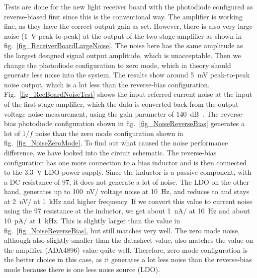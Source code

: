 Tests are done for the new light receiver board with the photodiode configured as reverse-biased first since this is the conventional way.  The amplifier is working fine, as they have the correct output gain as set.  However, there is also very large noise (\qty{1}{V} peak-to-peak) at the output of the two-stage amplifier as shown in fig.~\ref{fig_ReceiverBoardLargeNoise}.  The noise here has the same amplitude as the largest designed signal output amplitude, which is unacceptable.  Then we change the photodiode configuration to zero mode, which in theory should generate less noise into the system.  The results show around \qty{5}{mV} peak-to-peak noise output, which is a lot less than the reverse-bias configuration.  Fig.~\ref{fig_RecBoardNoiseTest} shows the input referred current noise at the input of the first stage amplifier, which the data is converted back from the output voltage noise measurement, using the gain parameter of \qty{140}{dB\Omega}.  The reverse-bias photodiode configuration shown in fig.~\ref{fig_NoiseReverseBias} generates a lot of $1/f$ noise than the zero mode configuration shown in fig.~\ref{fig_NoiseZeroMode}.  To find out what caused the noise performance difference, we have looked into the circuit schematic.  The reverse-bias configuration has one more connection to a bias inductor and is then connected to the \qty{3.3}{V} LDO power supply.  Since the inductor is a passive component, with a DC resistance of \qty{97}{\Omega}, it does not generate a lot of noise.  The LDO on the other hand, generates up to \qty{100}{nV/\sqrthz} voltage noise at \qty{10}{Hz}, and reduces to and stays at \qty{2}{nV/\sqrthz} at \qty{1}{kHz} and higher frequency.  If we convert this value to current noise using the \qty{97}{\Omega} resistance at the inductor, we get about \qty{1}{nA/\sqrthz} at \qty{10}{Hz} and about \qty{10}{pA/\sqrthz} at \qty{1}{kHz}.  This is slightly larger than the value in fig.~\ref{fig_NoiseReverseBias}, but still matches very well.  The zero mode noise, although also slightly smaller than the datasheet value, also matches the value on the amplifier (ADA4896) value quite well.  Therefore, zero mode configuration is the better choice in this case, as it generates a lot less noise than the reverse-bias mode because there is one less noise source (LDO).


